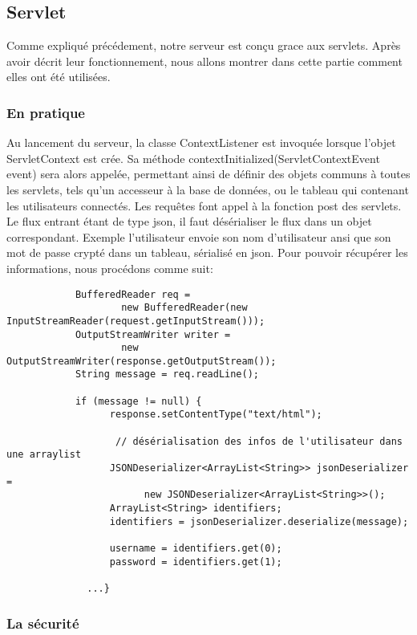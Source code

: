 \subsection{Servlet}
	
	Comme expliqué précédement, notre serveur est conçu grace aux \glspl{servlet}.
	Après avoir décrit leur fonctionnement, nous allons montrer dans cette partie
	comment elles ont été utilisées.
		
	\subsubsection{En pratique}
		Au lancement du serveur, la classe ContextListener est invoquée lorsque l'objet
		ServletContext est crée. Sa méthode contextInitialized(ServletContextEvent event) sera alors appelée, 
		permettant ainsi de définir des objets communs à toutes les
		\glspl{servlet}, tels qu'un accesseur à la base de données, ou le tableau qui
		contenant les utilisateurs connectés. Les requêtes font appel à la fonction
		post des \glspl{servlet}. Le flux entrant étant de type \gls{json}, il faut
		désérialiser le flux dans un objet correspondant. Exemple l'utilisateur envoie son nom d'utilisateur ansi que son mot de passe crypté
		dans un tableau, sérialisé en \gls{json}.
		Pour pouvoir récupérer les informations, nous procédons comme suit: 
		
		\begin{verbatim}
			BufferedReader req = 
				    new BufferedReader(new InputStreamReader(request.getInputStream()));
			OutputStreamWriter writer = 
				    new OutputStreamWriter(response.getOutputStream());
			String message = req.readLine();
			
			if (message != null) {
				  response.setContentType("text/html");
				
				   // désérialisation des infos de l'utilisateur dans une arraylist 
				  JSONDeserializer<ArrayList<String>> jsonDeserializer = 
					    new JSONDeserializer<ArrayList<String>>();
				  ArrayList<String> identifiers;
				  identifiers = jsonDeserializer.deserialize(message);
				
				  username = identifiers.get(0);
				  password = identifiers.get(1);
				  
			  ...}
		\end{verbatim}
		
		
	\subsubsection{La sécurité}
	
